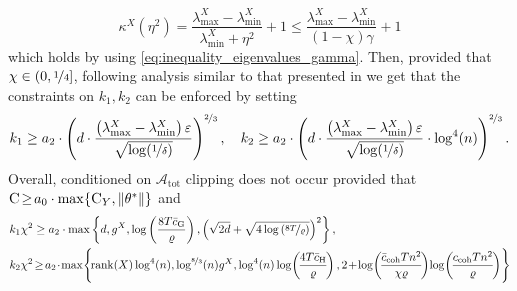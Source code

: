 \documentclass[11pt]{article}
\theoremstyle{definition}
\theoremstyle{plain}
\newcommand{\eps}{{\varepsilon}}
\newcommand{\Norm}[1]{\left\| #1 \right\|}
\providecommand{\norm}[1]{\Norm{#1}}
\renewcommand{\eps}{\varepsilon}
\begin{document}
\begin{equation}
    \kappa^{X}\left(\eta^2\right) = \frac{\lambda^{X}_{\max} - \lambda^{X}_{\min}}{\lambda^{X}_{\min} + \eta^2} + 1 \leq \frac{\lambda^{X}_{\max} - \lambda^{X}_{\min}}{\left(1 - \chi\right)\gamma} + 1 
\end{equation}
which holds by using \eqref{eq:inequality_eigenvalues_gamma}. 
Then, provided that $\chi\in (0, \nicefrac{1}{4}]$, following analysis similar to that presented in \citet{lev2026near} we get that the constraints on $k_1, k_2$ can be enforced by setting  
\begin{equation}
    k_1 \geq a_2\cdot \left(d \cdot \frac{\left(\lambda^{X}_{\max} -\lambda^{X}_{\min}\right)\eps}{\sqrt{\log(\nicefrac{1}{\delta})}}\right)^{\nicefrac{2}{3}}, \ \ \ k_2 \geq a_2\cdot \left(d \cdot \frac{\left(\lambda^{X}_{\max} -\lambda^{X}_{\min}\right)\eps}{\sqrt{\log(\nicefrac{1}{\delta})}}\cdot \log^4(n)\right)^{\nicefrac{2}{3}}.
\end{equation}
Overall, conditioned on $\mathcal{A}_{\mathrm{tot}}$ clipping does not occur  provided that $\textsc{C} \hspace{-0.15em}\geq\hspace{-0.15em} a_0 \cdot \max\hspace{-0.15em}\left\{\textsc{C}_Y, \norm{\theta^{*}}\right\}$ and 
\begin{align}
    k_1\chi^2 &\geq a_2\cdot \max\left\{d, g^{X}, \log\left(\frac{8T\bar{c}_{\mathrm{G}}}{\varrho}\right), \left(\sqrt{2d} + \sqrt{4\log\left(\nicefrac{8T}{\varrho}\right)}\right)^2\right\}, \\ 
    k_2\chi^2 &\hspace{-0.15em}\geq\hspace{-0.15em} a_2 \hspace{-0.15em}\cdot\hspace{-0.15em} \max\hspace{-0.15em}
    \Bigg\{\hspace{-0.15em}
        \mathrm{rank}(X)\log^4(n),
        \log^{\nicefrac{8}{3}}(n)g^{X}, \log^4(n)\log\hspace{-0.15em}\left(\hspace{-0.15em}\frac{4T\bar{c}_{\mathrm{H}}}{\varrho}\hspace{-0.15em}\right),2\hspace{-0.15em}+\hspace{-0.15em}\log\hspace{-0.15em}\left(\hspace{-0.15em}\frac{\bar{c}_{\mathrm{coh}} T n^2}{\chi\varrho}\hspace{-0.15em}\right)
        \hspace{-0.15em}\log\hspace{-0.15em}\left(\hspace{-0.15em}\frac{c_{\mathrm{coh}} T n^2}{\varrho}\hspace{-0.15em}\right)
    \hspace{-0.15em}\Bigg\}
\end{align}
\end{document}
